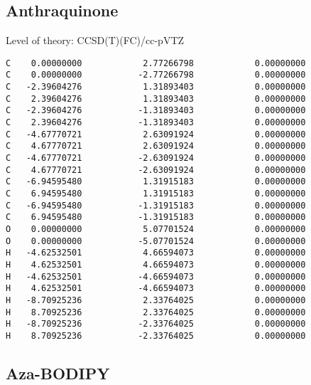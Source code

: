 \documentclass[journal=jctcce,manuscript=article,layout=traditional]{achemso}
\newcommand{\TZ}{cc-pVTZ}
\begin{document}
\subsection*{Anthraquinone}

\begin{singlespace}
Level of theory: CCSD(T)(FC)/{\TZ}
\begin{verbatim}
C    0.00000000            2.77266798            0.00000000
C    0.00000000           -2.77266798            0.00000000
C   -2.39604276            1.31893403            0.00000000
C    2.39604276            1.31893403            0.00000000
C   -2.39604276           -1.31893403            0.00000000
C    2.39604276           -1.31893403            0.00000000
C   -4.67770721            2.63091924            0.00000000
C    4.67770721            2.63091924            0.00000000
C   -4.67770721           -2.63091924            0.00000000
C    4.67770721           -2.63091924            0.00000000
C   -6.94595480            1.31915183            0.00000000
C    6.94595480            1.31915183            0.00000000
C   -6.94595480           -1.31915183            0.00000000
C    6.94595480           -1.31915183            0.00000000
O    0.00000000            5.07701524            0.00000000
O    0.00000000           -5.07701524            0.00000000
H   -4.62532501            4.66594073            0.00000000
H    4.62532501            4.66594073            0.00000000
H   -4.62532501           -4.66594073            0.00000000
H    4.62532501           -4.66594073            0.00000000
H   -8.70925236            2.33764025            0.00000000
H    8.70925236            2.33764025            0.00000000
H   -8.70925236           -2.33764025            0.00000000
H    8.70925236           -2.33764025            0.00000000
\end{verbatim}
\end{singlespace}

\subsection*{Aza-BODIPY}
\end{document}
